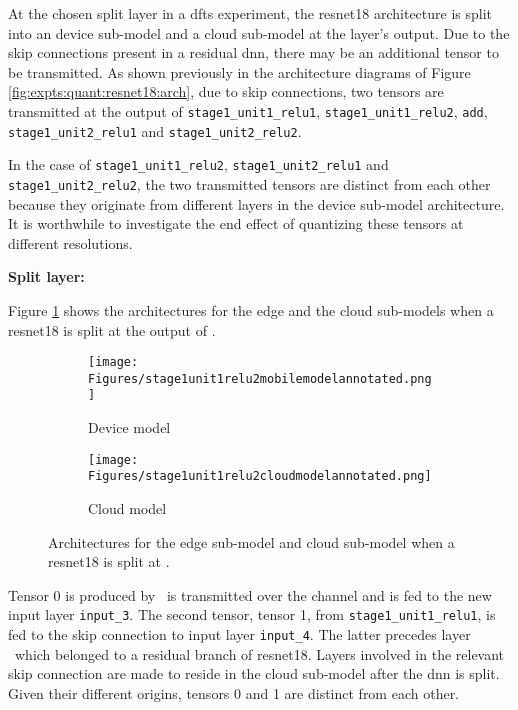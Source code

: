 At the chosen split layer in a \gls{dfts} experiment, the \gls{resnet18} architecture is split into an device sub-model and a cloud sub-model at the layer's output. Due to the skip connections present in a residual \gls{dnn}, there may be an additional tensor to be transmitted. As shown previously in the architecture diagrams of Figure \ref{fig:expts:quant:resnet18:arch}, due to skip connections, two tensors are transmitted at the output of \verb|stage1_unit1_relu1|, \verb|stage1_unit1_relu2|, \verb|add|, \verb|stage1_unit2_relu1| and \verb|stage1_unit2_relu2|. 

In the case of \verb|stage1_unit1_relu2|, \verb|stage1_unit2_relu1| and \verb|stage1_unit2_relu2|, the two transmitted tensors are distinct from each other because they originate from different layers in the device sub-model architecture. It is worthwhile to investigate the end effect of quantizing these tensors at different resolutions.

\textbf{Split layer:} \soneunitonerelutwo 

Figure \ref{fig:expts:quant:s1u1r2} shows the architectures for the edge and the cloud sub-models when a \gls{resnet18} is split at the output of \soneunitonerelutwo.

\begin{figure}[H]
	\centering
	\begin{subfigure}{0.34\textwidth}
		\centering
		\texttt{[image: Figures/stage1unit1relu2mobilemodelannotated.png]}
		\caption{Device model}
	\end{subfigure}
	\hfill 
	\begin{subfigure}{0.64\textwidth}
		\centering
		\texttt{[image: Figures/stage1unit1relu2cloudmodelannotated.png]}
		\caption{Cloud model}
	\end{subfigure}
\caption[ResNet18 split: two tensors transmitted from the edge to the cloud]{Architectures for the edge sub-model and cloud sub-model when a \gls{resnet18} is split at \soneunitonerelutwo.} \label{fig:expts:quant:s1u1r2}
\end{figure}

Tensor 0 is produced by \soneunitonerelutwo~is transmitted over the channel and is fed to the new input layer \verb|input_3|. The second tensor, tensor 1, from \verb|stage1_unit1_relu1|, is fed to the skip connection to input layer \verb|input_4|. The latter precedes layer \soneunitonesc~which belonged to a residual branch of \gls{resnet18}. Layers involved in the relevant skip connection are made to reside in the cloud sub-model after the \gls{dnn} is split. Given their different origins, tensors 0 and 1 are distinct from each other.

